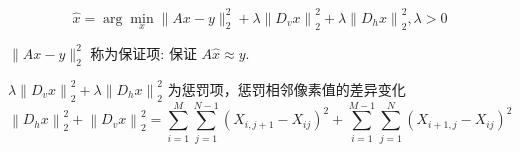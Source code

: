 $$
\hat{x}=\arg \min _{x}\|A x-y\|_{2}^{2}+\lambda\left\|D_{v} x\right\|_{2}^{2}+\lambda\left\|D_{h} x\right\|_{2}^{2}, \lambda>0
$$

$ \|A x-y\|_{2}^{2} $ 称为保证项: 保证 $ A \hat{x} \approx y $.

$ \lambda\left\|D_{v} x\right\|_{2}^{2}+\lambda\left\|D_{h} x\right\|_{2}^{2} $ 为惩罚项，惩罚相邻像素值的差异变化
$$
\left\|D_{h} x\right\|_{2}^{2}+\left\|D_{v} x\right\|_{2}^{2}=\sum_{i=1}^{M} \sum_{j=1}^{N-1}\left(X_{i, j+1}-X_{i j}\right)^{2}+\sum_{i=1}^{M-1} \sum_{j=1}^{N}\left(X_{i+1, j}-X_{i j}\right)^{2}
$$